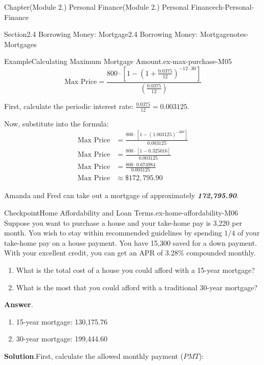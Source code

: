 \documentclass[oneside,10pt,]{book}
\newcommand{\blocktitlefont}{\relax}
\newcommand{\alert}[1]{\textbf{\textit{#1}}}
\newcommand{\amp}{&}
\begin{document}
\begin{chapterptx}{Chapter}{(Module 2.) Personal Finance}{}{(Module 2.) Personal Finance}{}{}{ch-Personal-Finance}
\begin{sectionptx}{Section}{2.4 Borrowing Money: Mortgage}{}{2.4 Borrowing Money: Mortgage}{}{}{notes-Mortgages}
\begin{example}{Example}{Calculating Maximum Mortgage Amount.}{ex-max-purchase-M05}
\begin{equation*}
\text{Max Price} = \frac{800 \cdot \left[1 - \left(1 + \frac{0.0375}{12}\right)^{-12 \cdot 30}\right]}{\left(\frac{0.0375}{12}\right)}
\end{equation*}
%
\par
First, calculate the periodic interest rate: \(\frac{0.0375}{12} = 0.003125\).%
\par
Now, substitute into the formula:%
\begin{align*}
\text{Max Price} \amp = \frac{800 \cdot \left[1 - (1.003125)^{-360}\right]}{0.003125}\\
\text{Max Price} \amp = \frac{800 \cdot [1 - 0.325016]}{0.003125}\\
\text{Max Price} \amp = \frac{800 \cdot 0.674984}{0.003125}\\
\text{Max Price} \amp \approx \$172,795.90
\end{align*}
%
\par
Amanda and Fred can take out a mortgage of approximately \alert{\textdollar{}172,795.90}.%
\end{example}
\begin{inlineexercise}{Checkpoint}{Home Affordability and Loan Terms.}{ex-home-affordability-M06}%
Suppose you want to purchase a house and your take-home pay is \textdollar{}3,220 per month. You wish to stay within recommended guidelines by spending \(1/4\) of your take-home pay on a house payment. You have \textdollar{}15,300 saved for a down payment. With your excellent credit, you can get an APR of 3.28\% compounded monthly.%
%
\begin{enumerate}
\item{}What is the total cost of a house you could afford with a 15-year mortgage?%
\item{}What is the most that you could afford with a traditional 30-year mortgage?%
\end{enumerate}
\par\smallskip%
\noindent\textbf{\blocktitlefont Answer}.\hypertarget{ex-home-affordability-M06-3}{}\quad{}%
\begin{enumerate}
\item{}15-year mortgage: \textdollar{}130,175.76%
\item{}30-year mortgage: \textdollar{}199,444.60%
\end{enumerate}
%
\par\smallskip%
\noindent\textbf{\blocktitlefont Solution}.\hypertarget{ex-home-affordability-M06-4}{}\quad{}First, calculate the allowed monthly payment (\(PMT\)):%

\end{inlineexercise}
\end{sectionptx}
\end{chapterptx}
\end{document}

